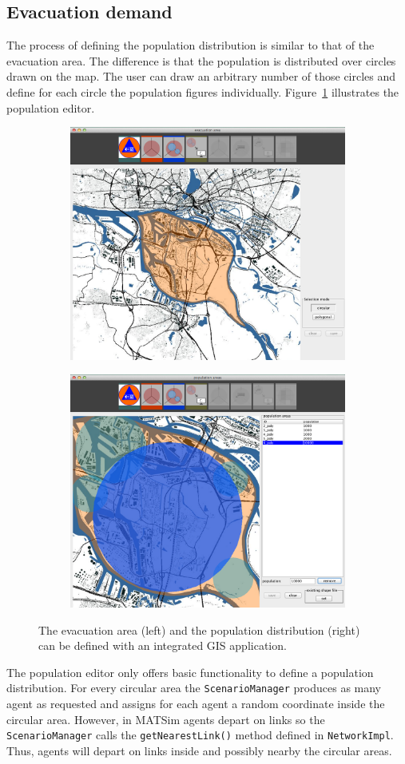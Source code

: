 \subsection{Evacuation demand}
The process of defining the population distribution is similar to that of the evacuation area. 
The difference is that the population is distributed over circles drawn on the map. 
The user can draw an arbitrary number of those circles and define for each circle the population figures individually. Figure~\ref{chap:evac:fig:area_pop} illustrates the population editor. 
\begin{figure}[!ht]
\begin{subfigure}
\centering
\includegraphics[width=.475\linewidth]{extending/figures/Evacuation/evac_area_sel}
\end{subfigure}\hfill
\begin{subfigure}
\centering
\includegraphics[width=.475\linewidth]{extending/figures/Evacuation/pop_sel}
\end{subfigure}
\caption{The evacuation area (left) and the population distribution (right) can be defined with an integrated GIS application.}\label{chap:evac:fig:area_pop}
\end{figure}
The population editor only offers basic functionality to define a population distribution. For every circular area the \lstinline+ScenarioManager+ produces as many agent as requested and assigns for each agent a random coordinate inside the circular area. However, in MATSim agents depart on links so the \lstinline+ScenarioManager+ calls the \lstinline+getNearestLink()+ method defined in \lstinline+NetworkImpl+. Thus, agents will depart on links inside and possibly nearby the circular areas. 

